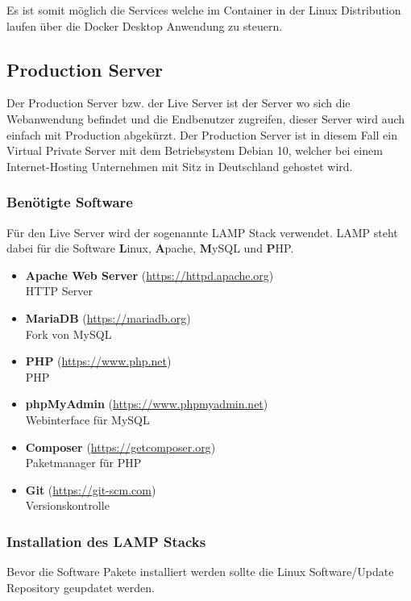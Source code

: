 Es ist somit möglich die Services welche im Container in der Linux Distribution
laufen über die Docker Desktop Anwendung zu steuern.


\subsection{Production Server}
Der Production Server bzw. der Live Server ist der Server wo sich die Webanwendung
befindet und die Endbenutzer zugreifen, dieser Server wird auch einfach mit
Production abgekürzt. Der Production Server ist in diesem Fall ein Virtual
Private Server mit dem Betriebsystem Debian 10, welcher bei einem
Internet-Hosting Unternehmen mit Sitz in Deutschland gehostet wird.


\subsubsection{Benötigte Software}

Für den Live Server wird der sogenannte \glqq LAMP\grqq{} Stack verwendet. LAMP steht dabei
für die Software \textbf{L}inux, \textbf{A}pache, \textbf{M}ySQL und \textbf{P}HP.

\begin{itemize}
  \item \textbf{Apache Web Server} (\url{https://httpd.apache.org}) \\ HTTP Server
  \item \textbf{MariaDB} (\url{https://mariadb.org}) \\ Fork von MySQL
  \item \textbf{PHP} (\url{https://www.php.net}) \\ \ac*{PHP}
  \item \textbf{phpMyAdmin} (\url{https://www.phpmyadmin.net}) \\ Webinterface
        für MySQL
  \item \textbf{Composer} (\url{https://getcomposer.org}) \\ Paketmanager für PHP
  \item \textbf{Git} (\url{https://git-scm.com}) \\ Versionskontrolle
\end{itemize}


\subsubsection{Installation des LAMP Stacks}
Bevor die Software Pakete installiert werden sollte die Linux Software/Update
Repository geupdatet werden.

